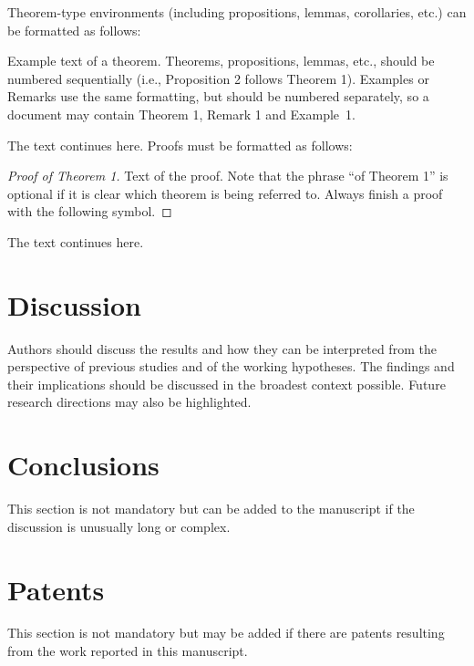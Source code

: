 \documentclass[journal,article,submit,moreauthors]{Definitions/mdpi}
\begin{document}
Theorem-type environments (including propositions, lemmas, corollaries, etc.) can be formatted as follows:
\begin{Theorem}
Example text of a theorem. Theorems, propositions, lemmas, etc., should be numbered sequentially (i.e., Proposition 2 follows Theorem 1). Examples or Remarks use the same formatting, but should be numbered separately, so a document may contain Theorem 1, Remark 1 and Example~1.
\end{Theorem}

The text continues here. Proofs must be formatted as follows:

\begin{proof}[Proof of Theorem 1]
Text of the proof. Note that the phrase ``of Theorem 1” is optional if it is clear which theorem is being referred to. Always finish a proof with the following symbol.
\end{proof}

The text continues here.

\section{Discussion}

Authors should discuss the results and how they can be interpreted from the perspective of previous studies and of the working hypotheses. The findings and their implications should be discussed in the broadest context possible. Future research directions may also be highlighted.

\section{Conclusions}

This section is not mandatory but can be added to the manuscript if the discussion is unusually long or complex.

\section{Patents}

This section is not mandatory but may be added if there are patents resulting from the work reported in this manuscript.

\vspace{6pt} 
\end{document}

